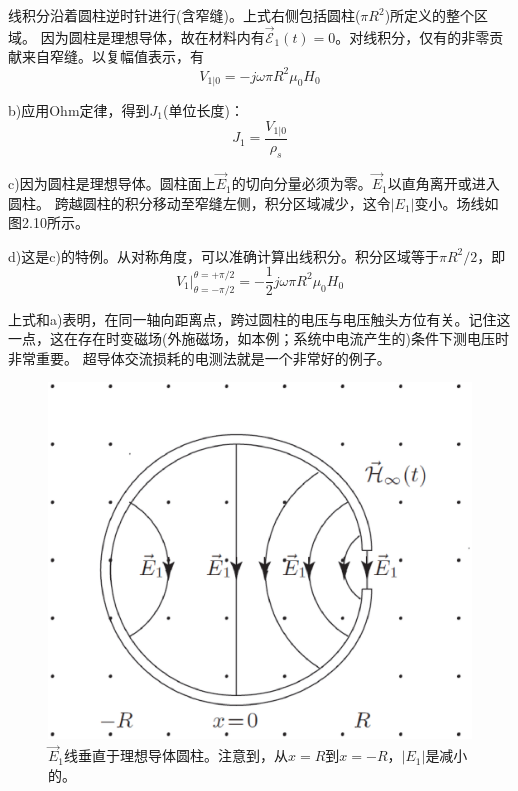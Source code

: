 线积分沿着圆柱逆时针进行(含窄缝)。上式右侧包括圆柱($\pi R^2$)所定义的整个区域。
因为圆柱是理想导体，故在材料内有$\vec{\mathcal{E}}_1(t)=0$。对线积分，仅有的非零贡献来自窄缝。以复幅值表示，有
\begin{equation*}
V_{1|0}=-j\omega \pi R^2 \mu_0 H_0 \tag{2.55}
\end{equation*}

b)应用Ohm定律，得到$J_1$(单位长度)：
\begin{equation*}
J_1=\frac{V_{1|0}}{\rho_s} \tag{S6.2}
\end{equation*}

c)因为圆柱是理想导体。圆柱面上$\vec{E}_1$的切向分量必须为零。$\vec{E}_1$以直角离开或进入圆柱。
跨越圆柱的积分移动至窄缝左侧，积分区域减少，这令$|E_1|$变小。场线如图2.10所示。

d)这是c)的特例。从对称角度，可以准确计算出线积分。积分区域等于$\pi R^2/2$，即
\begin{equation*}
V_1 |_{\theta=-\pi/2}^{\theta=+\pi/2}=-\frac{1}{2}j\omega \pi R^2 \mu_0 H_0   \tag{S6.3}
\end{equation*}

上式和a)表明，在同一轴向距离点，跨过圆柱的电压与电压触头方位有关。记住这一点，这在存在时变磁场(外施磁场，如本例；系统中电流产生的)条件下测电压时非常重要。
超导体交流损耗的电测法就是一个非常好的例子。

\begin{figure}[htbp]
  \centering
 \includegraphics[scale=0.4]{chpt2/figs/fig2.10.eps}
  \caption{$\vec{E}_1$线垂直于理想导体圆柱。注意到，从$x=R$到$x=-R$，$|E_1|$是减小的。}
\end{figure}




